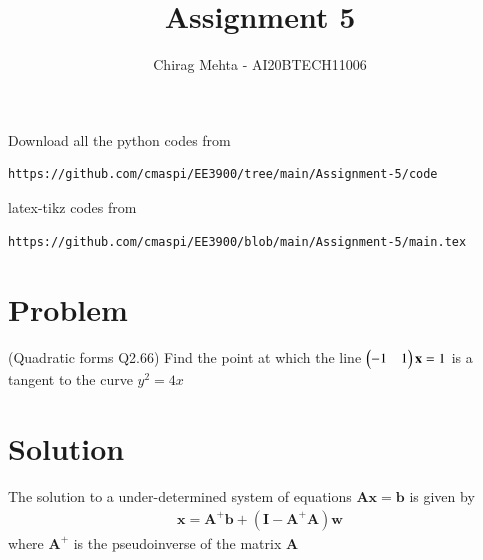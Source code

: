 \documentclass[journal,12pt,twocolumn]{IEEEtran}
\begin{document}
\makeatletter
{}
\makeatother
\let\StandardTheFigure\thefigure
\let\vec\mathbf
\renewcommand{\thefigure}{\theproblem}
\def\putbox#1#2#3{\makebox[0in][l]{\makebox[#1][l]{}\raisebox{\baselineskip}[0in][0in]{\raisebox{#2}[0in][0in]{#3}}}}
     \def\rightbox#1{\makebox[0in][r]{#1}}
     \def\centbox#1{\makebox[0in]{#1}}
     \def\topbox#1{\raisebox{-\baselineskip}[0in][0in]{#1}}
     \def\midbox#1{\raisebox{-0.5\baselineskip}[0in][0in]{#1}}
\vspace{3cm}
\title{Assignment 5}
\author{Chirag Mehta - AI20BTECH11006}
\maketitle
\newpage
\bigskip
\renewcommand{\thefigure}{\theenumi}
\renewcommand{\thetable}{\theenumi}
Download all the python codes from
\begin{lstlisting}
https://github.com/cmaspi/EE3900/tree/main/Assignment-5/code
\end{lstlisting}
latex-tikz codes from 
\begin{lstlisting}
https://github.com/cmaspi/EE3900/blob/main/Assignment-5/main.tex
\end{lstlisting}
\section{Problem}
(Quadratic forms Q2.66) Find the point at which the line 
$\myvec{-1 & 1}\vec{x}=1$ is a tangent to the curve $y^2=4x$
\section{Solution}

\begin{theorem}
The solution to a under-determined system of equations $\vec{Ax}=\vec{b}$ is given by
\begin{align}
    \vec{x}=\vec{A}^+\vec{b}+(\vec{I}-\vec{A}^+\vec{A})\vec{w} \label{eq:generalisedInverse}
\end{align}
where $\vec{A^+}$ is the pseudoinverse of the matrix $\vec{A}$\\
\end{theorem}
\end{document}

